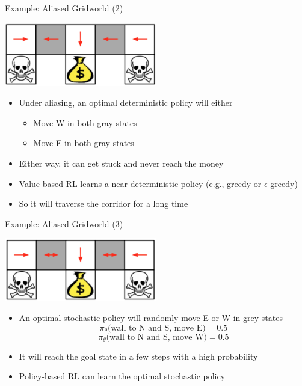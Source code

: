\documentclass[aspectratio=169]{../latex_main/tntbeamer}  %
\begin{document}
\begin{frame}[c]{Example: Aliased Gridworld (2)}
	
	\begin{center}
		\includegraphics[width=0.5\textwidth]{images/gridworld2.png}
	\end{center}
	
	\begin{itemize}
		\item Under aliasing, an optimal \alert{deterministic} policy will either
		\begin{itemize}
			\item Move W in both gray states 
			\item Move E in both gray states
		\end{itemize}
		\item Either way, it can get stuck and never reach the money
		\item Value-based RL learns a near-deterministic policy (e.g., greedy or $\epsilon$-greedy)
		\item So it will traverse the corridor for a long time
	\end{itemize}

\end{frame}
\begin{frame}[c]{Example: Aliased Gridworld (3)}
	
	\begin{center}
		\includegraphics[width=0.5\textwidth]{images/gridworld3.png}
	\end{center}
	
	\begin{itemize}
		\item An optimal \alert{stochastic} policy will randomly move E or W in grey states
		$$\pi_\theta\text{(wall to N and S, move E)} = 0.5 $$
		$$\pi_\theta\text{(wall to N and S, move W)} = 0.5 $$
		\item It will reach the goal state in a few steps with a high probability
		\item Policy-based RL can learn the optimal stochastic policy
	\end{itemize}
	
\end{frame}
\end{document}
